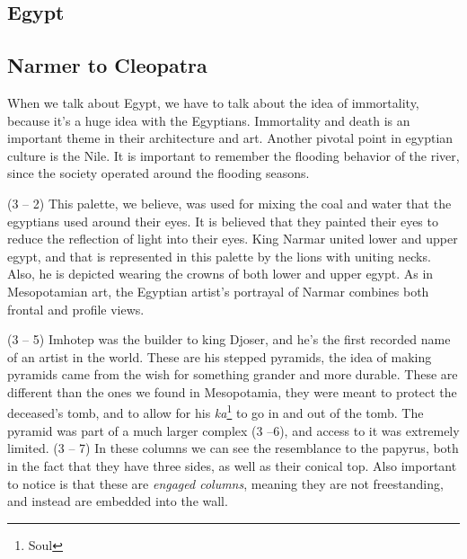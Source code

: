\documentclass{article}
\begin{document}
    \begin{spacing}{1.2}
    \newpage
    \section{Egypt}
    \subsection{Narmer to Cleopatra}
    When we talk about Egypt, we have to talk about the idea of immortality, because it's a huge idea with the Egyptians. Immortality and death is an important theme in their architecture and art.
    Another pivotal point in egyptian culture is the Nile. It is important to remember the flooding behavior of the river, since the society operated around the flooding seasons.
    
    
    (3 -- 2) This palette, we believe, was used for mixing the coal and water 
    that the egyptians used around their eyes. It is believed that they painted 
    their eyes to reduce the reflection of light into their eyes. King Narmar 
    united lower and upper egypt, and that is represented in this palette by 
    the lions with uniting necks. Also, he is depicted wearing the crowns of 
    both lower and upper egypt. As in Mesopotamian art, the Egyptian artist's portrayal of Narmar combines both frontal and profile views.

    (3 -- 5) Imhotep was the builder to king Djoser, and he's the first 
    recorded name of an artist in the world. These are his stepped pyramids, 
    the idea of making pyramids came from the wish for something grander and 
    more durable. These are different than the ones we found in Mesopotamia, 
    they were meant to protect the deceased's tomb, and to allow for his \emph
    {ka}\footnote{Soul} to go in and out of the tomb. The pyramid was part of a 
    much larger complex (3 --6), and access to it was extremely limited.
    (3 -- 7) In these columns we can see the resemblance to the papyrus, both 
    in the fact that they have three sides, as well as their conical top. Also 
    important to notice is that these are \emph{engaged columns}, meaning they 
    are not freestanding, and instead are embedded into the wall.
    

\end{spacing}
\end{document}

